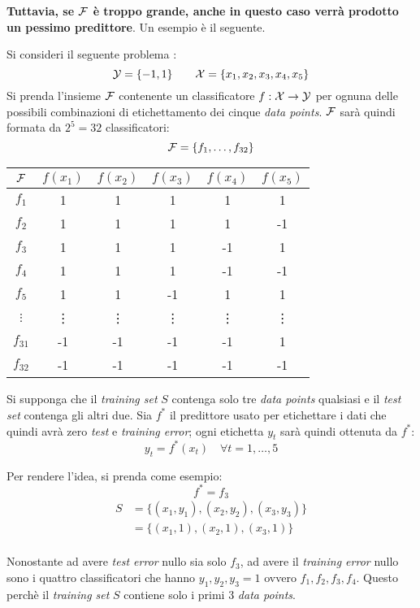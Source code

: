 \textbf{Tuttavia, se $\mathcal{F}$ è troppo grande, anche in questo caso verrà prodotto
un pessimo predittore}. Un esempio è il seguente.

Si consideri il seguente problema :
$$ \mathcal{Y} = \{-1,1\} \qquad \mathcal{X} = \{x_1,x_2,x_3,x_4,x_5\} $$
Si prenda l'insieme $\mathcal{F}$ contenente un classificatore $f:\mathcal{X}\rightarrow\mathcal{Y}$ per
ognuna delle possibili combinazioni di etichettamento dei cinque \textit{data
points}. $\mathcal{F}$ sarà quindi formata da $2^5=32$ classificatori:
$$ \mathcal{F} = \{f_1,\dots,f_{32}\} $$

\begin{center}
    \begin{tabular}{|c|c|c|c|c|c|} \hline
        $\mathcal{F}$  & $f(x_1)$ & $f(x_2)$ & $f(x_3)$ & $f(x_4)$ & $f(x_5)$ \\ \hline
        $f_1$ &  1 &  1 &  1 &  1 &  1 \\
        $f_2$ &  1 &  1 &  1 &  1 & -1 \\
        $f_3$ &  1 &  1 &  1 & -1 &  1 \\
        $f_4$ &  1 &  1 &  1 & -1 & -1 \\
        $f_5$ &  1 &  1 & -1 &  1 &  1 \\
        $\vdots$ & \vdots & \vdots & \vdots & \vdots & \vdots \\
        $f_{31}$ & -1 & -1 & -1 & -1 &  1 \\
        $f_{32}$ & -1 & -1 & -1 & -1 & -1 \\ \hline
    \end{tabular}
\end{center}
\vspace{1em}

Si supponga che il \textit{training set} $S$ contenga solo tre \textit{data points}
qualsiasi e il \textit{test set} contenga gli altri due. Sia $f^*$ il predittore usato
per etichettare i dati che quindi avrà zero \textit{test} e \textit{training error};
ogni etichetta $y_t$ sarà quindi ottenuta da $f^*$:
$$ y_t=f^*(x_t) \quad \forall t=1,\dots,5 $$ 

Per rendere l'idea, si prenda come esempio:
$$ f^*=f_3 $$
$$
\begin{aligned}
    S &= \{(x_1,y_1),(x_2,y_2),(x_3,y_3)\} \\
      &= \{(x_1,1),(x_2,1),(x_3,1)\} \\
\end{aligned}
$$

Nonostante ad avere \textit{test error} nullo sia solo $f_3$, ad avere il \textit{training
error} nullo sono i quattro classificatori che hanno $y_1,y_2,y_3=1$ ovvero $f_1,f_2,f_3,f_4$.
Questo perchè il \textit{training set} $S$ contiene solo i primi 3 \textit{data points}.

